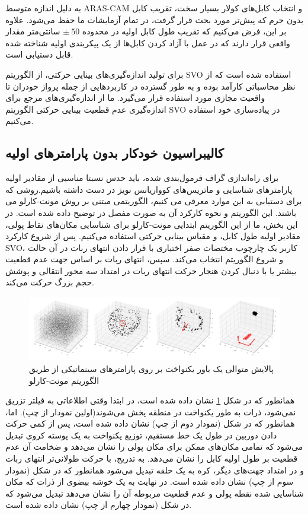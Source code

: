 به دلیل اندازه متوسط ARAS-CAM و انتخاب کابل‌های کولار بسیار سخت، تقریب کابل بدون جرم که پیش‌تر مورد بحث قرار گرفت، در تمام آزمایشات ما حفظ می‌شود. علاوه بر این، فرض می‌کنیم که تقریب طول کابل اولیه در محدوده 
$\pm~50$
سانتی‌متر مقدار واقعی قرار دارند که در عمل با آزاد کردن کابل‌ها از یک پیکربندی اولیه شناخته شده قابل دستیابی است.

برای تولید اندازه‌گیری‌های بینایی حرکتی، از الگوریتم SVO
\cite{Forster2014ICRA}
استفاده شده است که از نظر محاسباتی کارآمد بوده و به طور گسترده در کاربردهایی از جمله پرواز خودران تا واقعیت مجازی مورد استفاده قرار می‌گیرد. ما از اندازه‌گیری‌های مرجع برای اندازه‌گیری عدم قطعیت بینایی حرکتی الگوریتم SVO در پیاده‌سازی خود استفاده می‌کنیم.

\subsection{کالیبراسیون خودکار بدون پارامترهای اولیه} \label{seq:monte_carlo}
برای راه‌اندازی گراف فرمول‌بندی شده، باید حدس نسبتا مناسبی از مقادیر اولیه پارامتر‌های شناسایی و ماتریس‌های کوواریانس نویز در دست داشته باشیم.روشی که برای دستیابی به این موارد معرفی می کنیم، الگوریتمی مبتنی بر روش مونت-کارلو می باشند. این الگوریتم و نحوه کارکرد آن به صورت مفصل در 
\cite{khorrambakht2023graph}
توضیح داده شده است. در این بخش، ما از این الگوریتم ابتدایی مونت-کارلو برای شناسایی مکان‌های نقاط پولی، مقادیر اولیه طول کابل، و مقیاس بینایی حرکتی استفاده می‌کنیم. پس از شروع کارکرد SVO، کاربر یک چارچوب مختصات صفر اختیاری با قرار دادن انتهای ربات در آن حالت و شروع الگوریتم انتخاب می‌کند. سپس، انتهای ربات بر اساس جهت عدم قطعیت بیشتر یا با دنبال کردن هنجار حرکت انتهای ربات در امتداد سه محور انتقالی و پوشش حجم بزرگ حرکت می‌کند.

\begin{figure}
	\centering
	\includegraphics[width=1\linewidth]{img/monte_carlo}
	\caption{پالایش متوالی یک باور یکنواخت بر روی پارامترهای سینماتیکی از طریق الگوریتم مونت-کارلو}
	\label{fig:montecarlo}
\end{figure}

همانطور که در شکل 
\ref{fig:montecarlo}
نشان داده شده است، در ابتدا وقتی اطلاعاتی به فیلتر تزریق نمی‌شود، ذرات به طور یکنواخت در منطقه پخش می‌شوند(اولین نمودار از چپ). اما، همانطور که در شکل (نمودار دوم از چپ) نشان داده شده است، پس از کمی حرکت دادن دوربین در طول یک خط مستقیم، توزیع یکنواخت به یک پوسته کروی تبدیل می‌شود که تمامی مکان‌های ممکن برای مکان پولی را نشان می‌دهد و ضخامت آن عدم قطعیت بر طول اولیه کابل را نشان می‌دهد. به تدریج، با حرکت طولانی‌تر انتهای ربات و در امتداد جهت‌های دیگر، کره به یک حلقه تبدیل می‌شود همانطور که در شکل (نمودار سوم از چپ) نشان داده شده است. در نهایت به یک خوشه بیضوی از ذرات که مکان شناسایی شده نقطه پولی و عدم قطعیت مربوطه آن را نشان می‌دهد تبدیل می‌شود که در شکل (نمودار چهارم از چپ) نشان داده شده است.

